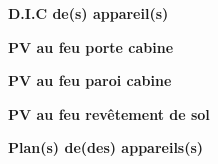 \documentclass[a4paper, oneside, 10pt, french]{article}
\begin{document}
\newpage

\vspace*{10cm}

\begin{center}
\textbf{\Huge D.I.C de(s) appareil(s)}
\end{center}

\newpage

\vspace*{10cm}

\begin{center}
\textbf{\Huge PV au feu porte cabine}
\end{center}

\newpage

\vspace*{10cm}

\begin{center}
\textbf{\Huge PV au feu paroi cabine}
\end{center}

\newpage

\vspace*{10cm}

\begin{center}
\textbf{\Huge PV au feu revêtement de sol}
\end{center}

\newpage

\vspace*{10cm}

\begin{center}
\textbf{\Huge Plan(s) de(des) appareils(s)}
\end{center}
\end{document}

